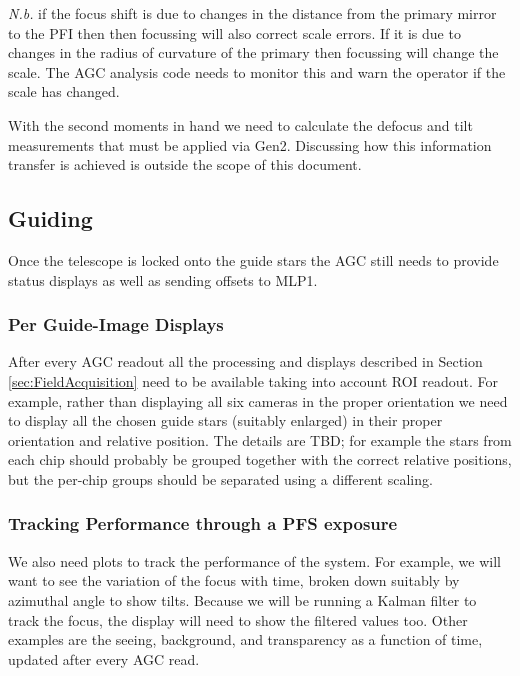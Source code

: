 \documentclass[12pt]{article}
\newcommand{\Nb}{\textit{N.b.}\xspace}
\newcommand{\AGC}{\gls{AGC}\xspace}
\newcommand{\PFI}{\gls{PFI}\xspace}
\newcommand{\TBD}{\gls{TBD}\xspace}
\newcommand{\secRef}[1]{Section \ref{sec:#1}}
\begin{document}
\Nb if the focus shift is due to changes in the distance from the primary mirror to the \PFI then
then focussing will also correct scale errors.  If it is due to changes in the radius of curvature
of the primary then focussing will change the scale.  The \AGC analysis code needs to monitor this
and warn the operator if the scale has changed.

With the second moments in hand we need to calculate the defocus and tilt measurements that must be applied
via \gls{Gen2}.  Discussing how this information transfer is achieved is outside the scope of this document.


\subsection{Guiding}

Once the telescope is locked onto the guide stars the \AGC still needs to provide status displays
as well as sending offsets to \gls{MLP1}.

\subsubsection{Per Guide-Image Displays}

After every \AGC readout all the processing and displays described in \secRef{FieldAcquisition} need
to be available taking into account \gls{ROI} readout.  For example, rather than displaying
all six cameras in the proper orientation we need to display all the chosen guide stars (suitably enlarged)
in their proper orientation and relative position.  The details are \TBD; for example the stars
from each chip should probably be grouped together with the correct relative positions, but the
per-chip groups should be separated using a different scaling.

\subsubsection{Tracking Performance through a PFS exposure}

We also need plots to track the performance of the system.  For example, we will want to see the variation
of the focus with time, broken down suitably by azimuthal angle to show tilts.  Because we will be running
a \gls{Kalman filter} to track the focus, the display will need to show the filtered values too.  Other
examples are the seeing, background, and transparency as a function of time, updated after every \AGC read.
\end{document}
